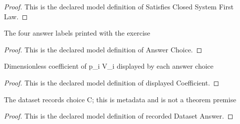 \begin{proof}
  This is the declared model definition of Satisfies Closed System First Law.
\end{proof}
\begin{definition}
  \label{def:physics:phyx-mini-0408:phyxminiproblems-problemphyxmini0408-answerchoice}
  The four answer labels printed with the exercise
\end{definition}
\begin{proof}
  This is the declared model definition of Answer Choice.
\end{proof}
\begin{definition}
  \label{def:physics:phyx-mini-0408:phyxminiproblems-problemphyxmini0408-answerchoice-displayedcoefficient}
  Dimensionless coefficient of p\_i V\_i displayed by each answer choice
\end{definition}
\begin{proof}
  This is the declared model definition of displayed Coefficient.
\end{proof}
\begin{definition}
  \label{def:physics:phyx-mini-0408:phyxminiproblems-problemphyxmini0408-recordeddatasetanswer}
  The dataset records choice C; this is metadata and is not a theorem premise
\end{definition}
\begin{proof}
  This is the declared model definition of recorded Dataset Answer.
\end{proof}
